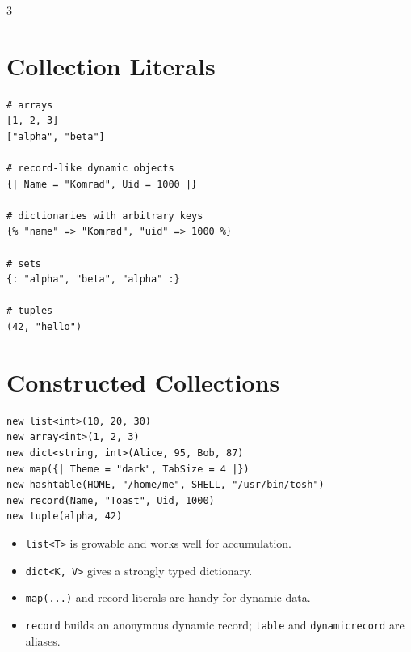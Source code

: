 


\footnotesize
{}

\begin{multicols*}{3}

\section{Collection Literals}
\begin{lstlisting}
# arrays
[1, 2, 3]
["alpha", "beta"]

# record-like dynamic objects
{| Name = "Komrad", Uid = 1000 |}

# dictionaries with arbitrary keys
{% "name" => "Komrad", "uid" => 1000 %}

# sets
{: "alpha", "beta", "alpha" :}

# tuples
(42, "hello")
\end{lstlisting}


\section{Constructed Collections}
\begin{lstlisting}
new list<int>(10, 20, 30)
new array<int>(1, 2, 3)
new dict<string, int>(Alice, 95, Bob, 87)
new map({| Theme = "dark", TabSize = 4 |})
new hashtable(HOME, "/home/me", SHELL, "/usr/bin/tosh")
new record(Name, "Toast", Uid, 1000)
new tuple(alpha, 42)
\end{lstlisting}

\begin{itemize}
\item \texttt{list<T>} is growable and works well for accumulation.
\item \texttt{dict<K, V>} gives a strongly typed dictionary.
\item \texttt{map(...)} and record literals are handy for dynamic data.
\item \texttt{record} builds an anonymous dynamic record; \texttt{table} and \texttt{dynamicrecord} are aliases.
\end{itemize}


\end{multicols*}
